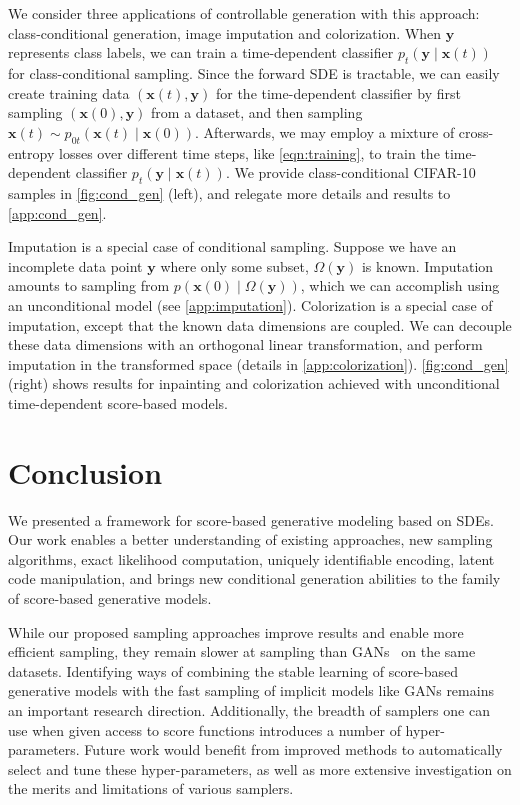We consider three applications of controllable generation with this approach: class-conditional generation, image imputation and colorization. When $\mathbf{y}$ represents class labels, we can train a time-dependent classifier $p_t(\mathbf{y} \mid \mathbf{x}(t))$ for class-conditional sampling. Since the forward SDE is tractable, we can easily create training data $(\mathbf{x}(t), \mathbf{y})$ for the time-dependent classifier by first sampling $(\mathbf{x}(0), \mathbf{y})$ from a dataset, and then sampling $\mathbf{x}(t) \sim p_{0t}(\mathbf{x}(t) \mid \mathbf{x}(0))$. Afterwards, we may employ a mixture of cross-entropy losses over different time steps, like \ref{eqn:training}, to train the time-dependent classifier $p_t(\mathbf{y} \mid \mathbf{x}(t))$. We provide class-conditional CIFAR-10 samples in \ref{fig:cond_gen} (left), and relegate more details and results to \ref{app:cond_gen}.

Imputation is a special case of conditional sampling. Suppose we have an incomplete data point $\mathbf{y}$ where only some subset, $\Omega(\mathbf{y})$ is known. Imputation amounts to sampling from $p(\mathbf{x}(0) \mid \Omega(\mathbf{y}))$, which we can accomplish using an unconditional model (see \ref{app:imputation}). Colorization is a special case of imputation, except that the known data dimensions are coupled. We can decouple these data dimensions with an orthogonal linear transformation, and perform imputation in the transformed space (details in \ref{app:colorization}). \ref{fig:cond_gen} (right) shows results for inpainting and colorization achieved with unconditional time-dependent score-based models.

\section{Conclusion}
We presented a framework for score-based generative modeling based on SDEs. Our work enables a better understanding of existing approaches,  new sampling algorithms, exact likelihood computation, uniquely identifiable encoding, latent code manipulation, and brings new conditional generation abilities to the family of score-based generative models.

While our proposed sampling approaches improve results and enable more efficient sampling, they remain slower at sampling than GANs~\citep{goodfellow2014generative} on the same datasets. Identifying ways of combining the stable learning of score-based generative models with the fast sampling of implicit models like GANs remains an important research direction. Additionally, the breadth of samplers one can use when given access to score functions introduces a number of hyper-parameters. Future work would benefit from improved methods to automatically select and tune these hyper-parameters, as well as more extensive investigation on the merits and limitations of various samplers.


